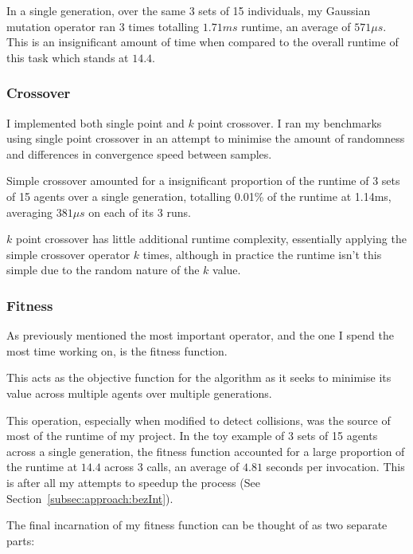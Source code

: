 In a single generation, over the same 3 sets of 15 individuals, my Gaussian mutation operator ran 3 times totalling $1.71 ms$ runtime, an average of $571\mu s$. This is an insignificant amount of time when compared to the overall runtime of this task which stands at $14.4$.

\subsubsection{Crossover}

I implemented both single point and $k$ point crossover. I ran my benchmarks using single point crossover in an attempt to minimise the amount of randomness and differences in convergence speed between samples.

Simple crossover amounted for a insignificant proportion of the runtime of 3 sets of 15 agents over a single generation, totalling 0.01\% of the runtime at 1.14ms, averaging $381\mu s$ on each of its 3 runs.

$k$ point crossover has little additional runtime complexity, essentially applying the simple crossover operator $k$ times, although in practice the runtime isn't this simple due to the random nature of the $k$ value.


\subsubsection{Fitness}

As previously mentioned the most important operator, and the one I spend the most time working on, is the fitness function.

This acts as the objective function for the algorithm as it seeks to minimise its value across multiple agents over multiple generations.

This operation, especially when modified to detect collisions, was the source of most of the runtime of my project. In the toy example of 3 sets of 15 agents across a single generation, the fitness function accounted for a large proportion of the runtime at $14.4$ across 3 calls, an average of $4.81$ seconds per invocation. This is after all my attempts to speedup the process (See Section~\ref{subsec:approach:bezInt}).

The final incarnation of my fitness function can be thought of as two separate parts:

